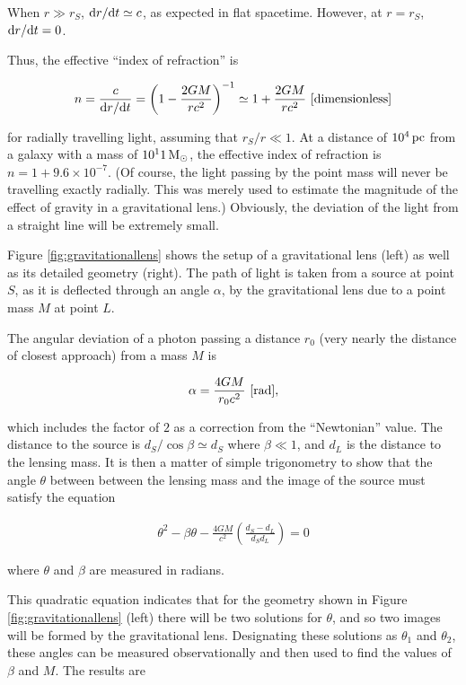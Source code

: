 \documentclass[a4paper,10pt]{article}
\begin{document}
{\noindent}When $r\gg r_S$, ${\rm d}r/{\rm d}t\simeq c$, as expected in flat spacetime. However, at $r=r_S$, ${\rm d}r/{\rm d}t=0$.

{\noindent}Thus, the effective ``index of refraction'' is

\begin{align*}
    n = \frac{c}{{\rm d}r/{\rm d}t} = \left(1-\frac{2GM}{rc^2}\right)^{-1} \simeq 1+ \frac{2GM}{rc^2} ~ [{\rm dimensionless}]
\end{align*}

{\noindent}for radially travelling light, assuming that $r_S/r\ll1$. At a distance of $10^4\,{\rm pc}$ from a galaxy with a mass of $10^11\,{\rm M_\odot}$, the effective index of refraction is $n=1+9.6\times10^{-7}$. (Of course, the light passing by the point mass will never be travelling exactly radially. This was merely used to estimate the magnitude of the effect of gravity in a gravitational lens.) Obviously, the deviation of the light from a straight line will be extremely small. 

{\noindent}Figure \ref{fig:gravitationallens} shows the setup of a gravitational lens (left) as well as its detailed geometry (right). The path of light is taken from a source at point $S$, as it is deflected through an angle $\alpha$, by the gravitational lens due to a point mass $M$ at point $L$.

{\noindent}The angular deviation of a photon passing a distance $r_0$ (very nearly the distance of closest approach) from a mass $M$ is

\begin{align*}
    \alpha = \frac{4GM}{r_0c^2} ~ [{\rm rad}],
\end{align*}

{\noindent}which includes the factor of $2$ as a correction from the ``Newtonian'' value. The distance to the source is $d_S/\cos\beta\simeq d_S$ where $\beta\ll1$, and $d_L$ is the distance to the lensing mass. It is then a matter of simple trigonometry to show that the angle $\theta$ between between the lensing mass and the image of the source must satisfy the equation

\begin{align*}
    \theta^2 - \beta\theta - \frac{4GM}{c^2} \left(\frac{d_S-d_L}{d_Sd_L}\right) = 0
\end{align*}

{\noindent}where $\theta$ and $\beta$ are measured in radians.

{\noindent}This quadratic equation indicates that for the geometry shown in Figure \ref{fig:gravitationallens} (left) there will be two solutions for $\theta$, and so two images will be formed by the gravitational lens. Designating these solutions as $\theta_1$ and $\theta_2$, these angles can be measured observationally and then used to find the values of $\beta$ and $M$. The results are
\end{document}
